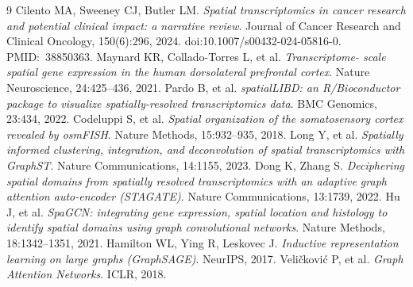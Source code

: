 \documentclass[11pt]{article}
\begin{document}
\begin{thebibliography}{9}
\small
{} Cilento MA, Sweeney CJ, Butler LM. \textit{Spatial
transcriptomics in cancer research and potential clinical impact: a narrative
review}. Journal of Cancer Research and Clinical Oncology, 150(6):296, 2024.
doi:10.1007/s00432-024-05816-0. PMID:~38850363.
 Maynard KR, Collado-Torres L, et al. \textit{Transcriptome-
scale spatial gene expression in the human dorsolateral prefrontal cortex}.
Nature Neuroscience, 24:425--436, 2021.
 Pardo B, et al. \textit{spatialLIBD: an R/Bioconductor package
to visualize spatially-resolved transcriptomics data}. BMC Genomics, 23:434, 2022.
 Codeluppi S, et al. \textit{Spatial organization of the
somatosensory cortex revealed by osmFISH}. Nature Methods, 15:932--935, 2018.
 Long Y, et al. \textit{Spatially informed clustering,
integration, and deconvolution of spatial transcriptomics with GraphST}. Nature
Communications, 14:1155, 2023.
 Dong K, Zhang S. \textit{Deciphering spatial domains from
spatially resolved transcriptomics with an adaptive graph attention auto-encoder
(STAGATE)}. Nature Communications, 13:1739, 2022.
 Hu J, et al. \textit{SpaGCN: integrating gene expression, spatial
location and histology to identify spatial domains using graph convolutional
networks}. Nature Methods, 18:1342--1351, 2021.
 Hamilton WL, Ying R, Leskovec J. \textit{Inductive
representation learning on large graphs (GraphSAGE)}. NeurIPS, 2017.
 Veli\v{c}kovi\'c P, et al. \textit{Graph Attention
Networks}. ICLR, 2018.
\end{thebibliography}
\end{document}
